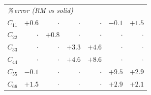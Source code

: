 \begin{table}[t]
\begin{tabular}{lrrrrrr}
\midrule
\multicolumn{7}{l}{\textit{\%\,error (RM vs solid)}}\\
$C_{11}$ & $+0.6$ & $\cdot$ & $\cdot$ & $\cdot$ & $-0.1$ & $+1.5$\\
$C_{22}$ & $\cdot$ & $+0.8$ & $\cdot$ & $\cdot$ & $\cdot$ & $\cdot$\\
$C_{33}$ & $\cdot$ & $\cdot$ & $+3.3$ & $+4.6$ & $\cdot$ & $\cdot$\\
$C_{44}$ & $\cdot$ & $\cdot$ & $+4.6$ & $+8.6$ & $\cdot$ & $\cdot$\\
$C_{55}$ & $-0.1$ & $\cdot$ & $\cdot$ & $\cdot$ & $+9.5$ & $+2.9$\\
$C_{66}$ & $+1.5$ & $\cdot$ & $\cdot$ & $\cdot$ & $+2.9$ & $+2.1$\\
\bottomrule
\end{tabular}
\end{table}